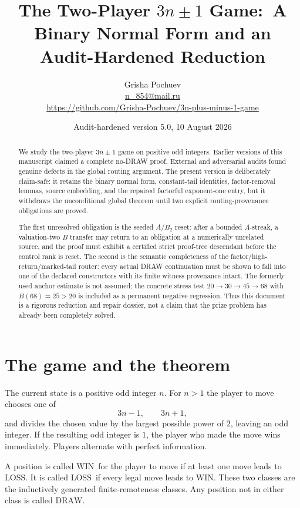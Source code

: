 \documentclass[11pt]{article}
\title{The Two-Player $3n\mathbin{\pm}1$ Game:\
A Binary Normal Form and an Audit-Hardened Reduction}
\author{Grisha Pochuev\\
  \small\href{mailto:n_854@mail.ru}{n\_854@mail.ru}\\
  \small\url{https://github.com/Grisha-Pochuev/3n-plus-minus-1-game}}
\date{Audit-hardened version 5.0, 10 August 2026}
\newcommand{\WIN}{\ensuremath{\mathrm{WIN}}}
\newcommand{\LOSS}{\ensuremath{\mathrm{LOSS}}}
\newcommand{\DRAW}{\ensuremath{\mathrm{DRAW}}}
\begin{document}
\maketitle

\begin{abstract}
We study the two-player $3n\pm1$ game on positive odd integers.  Earlier
versions of this manuscript claimed a complete no-DRAW proof.  External and
adversarial audits found genuine defects in the global routing argument.  The
present version is deliberately claim-safe: it retains the binary normal
form, constant-tail identities, factor-removal lemmas, source embedding, and
the repaired factorful exponent-one entry, but it withdraws the unconditional
global theorem until two explicit routing-provenance obligations are proved.

The first unresolved obligation is the seeded $A/B_2$ reset: after a bounded
$A$-streak, a valuation-two $B$ transfer may return to an obligation at a
numerically unrelated source, and the proof must exhibit a certified strict
proof-tree descendant before the control rank is reset.  The second is the
semantic completeness of the factor/high-return/marked-tail router: every
actual DRAW continuation must be shown to fall into one of the declared
constructors with its finite witness provenance intact.  The formerly used
anchor estimate is not assumed; the concrete stress test
$20\to30\to45\to68$ with $B(68)=25>20$ is included as a permanent negative
regression.  Thus this document is a rigorous reduction and repair dossier,
not a claim that the prize problem has already been completely solved.
\end{abstract}

\tableofcontents

\section{The game and the theorem}

The current state is a positive odd integer $n$. For $n>1$ the player to move
chooses one of
\[
  3n-1,\qquad 3n+1,
\]
and divides the chosen value by the largest possible power of $2$, leaving an
odd integer. If the resulting odd integer is $1$, the player who made the move
wins immediately. Players alternate with perfect information.

A position is called \WIN\ for the player to move if at least one move leads to
\LOSS. It is called \LOSS\ if every legal move leads to \WIN. These two classes
are the inductively generated finite-remoteness classes. Any position not in
either class is called \DRAW.
\end{document}
